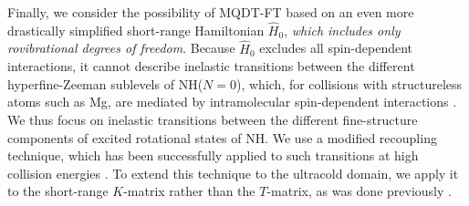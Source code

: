 \documentclass[reprint,amssymb,noeprint,twocolumn,longbibliography]{revtex4-2}
\begin{document}
Finally, we consider the possibility of MQDT-FT based on an even more drastically simplified short-range Hamiltonian $\hat{H}_0$,  {\it which includes only rovibrational degrees of freedom}. Because $\hat{H}_0$ excludes all spin-dependent interactions, it cannot describe inelastic transitions between the different hyperfine-Zeeman sublevels of NH($N=0$), which, for collisions with structureless atoms such as Mg, are mediated by intramolecular spin-dependent interactions \cite{Krems_04,Campbell_09}. We thus focus on inelastic transitions between the different fine-structure components of excited rotational states of NH.
We use a modified recoupling technique, which has been successfully applied to such transitions at high collision energies   \cite{Corey_83,Alexander_85,Corey_85,Lique_11,Lique_19}.  
To extend this technique to the ultracold domain, we apply it to the short-range $K$-matrix rather than the $T$-matrix, as was done previously \cite{Corey_83,Alexander_85,Corey_85,Lique_11,Lique_19}.



\end{document}
